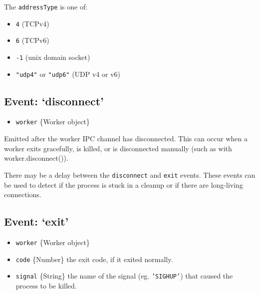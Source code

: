The \texttt{addressType} is one of:

\begin{itemize}
\itemsep1pt\parskip0pt
\item
  \texttt{4} (TCPv4)
\item
  \texttt{6} (TCPv6)
\item
  \texttt{-1} (unix domain socket)
\item
  \texttt{"udp4"} or \texttt{"udp6"} (UDP v4 or v6)
\end{itemize}

\subsection{Event: `disconnect'}\label{event-disconnect}

\begin{itemize}
\itemsep1pt\parskip0pt
\item
  \texttt{worker} \{Worker object\}
\end{itemize}

Emitted after the worker IPC channel has disconnected. This can occur
when a worker exits gracefully, is killed, or is disconnected manually
(such as with worker.disconnect()).

There may be a delay between the \texttt{disconnect} and \texttt{exit}
events. These events can be used to detect if the process is stuck in a
cleanup or if there are long-living connections.

\begin{Shaded}
\begin{Highlighting}[]
\NormalTok{(}\NormalTok{, }
  \NormalTok{(} \NormalTok{+ } \NormalTok{+ }\NormalTok{);}
\NormalTok{\});}
\end{Highlighting}
\end{Shaded}

\subsection{Event: `exit'}\label{event-exit}

\begin{itemize}
\itemsep1pt\parskip0pt
\item
  \texttt{worker} \{Worker object\}
\item
  \texttt{code} \{Number\} the exit code, if it exited normally.
\item
  \texttt{signal} \{String\} the name of the signal (eg.
  \texttt{'SIGHUP'}) that caused the process to be killed.
\end{itemize}


